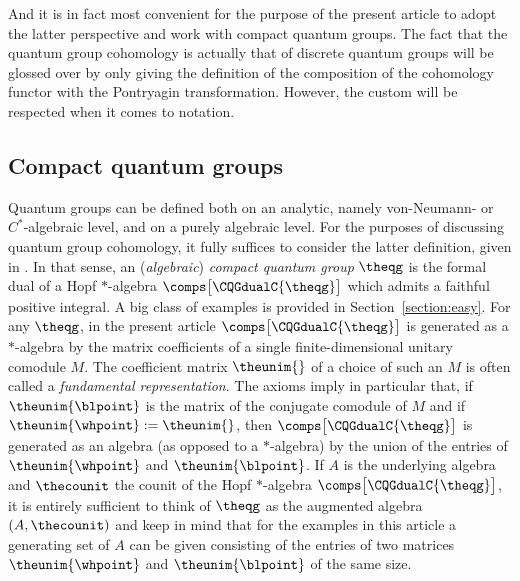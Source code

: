 \documentclass[pdftex]{sigma}
\numberwithin{equation}{section}
\begin{document}
And it is in fact most convenient for the purpose of the present article to adopt the latter perspective and work with compact quantum groups. The fact that the quantum group cohomology is actually that of discrete quantum groups will be glossed over by only giving the definition of the composition of the cohomology functor with the Pontryagin transformation. However, the custom will be respected when it comes to notation.


\subsection{Compact quantum groups}
\label{section:quantum-groups-definition}
{
  \newcommand{\thealgebra}{A}
  \newcommand{\thefund}{\theunim{}}
  \newcommand{\thecomodule}{M}
  \newcommand{\thefundwh}{\theunim{\whpoint}}
  \newcommand{\thefundbl}{\theunim{\blpoint}}
  Quantum groups can be defined both on an analytic, namely von-Neumann- or $C^\ast$-algebraic level, and on a purely algebraic level. For the purposes of discussing quantum group cohomology, it fully suffices to consider the latter definition, given in \cite{DijkhuizenKoornwinder1994}. In that sense, an (\emph{algebraic}) \emph{compact quantum group} $\theqg$ is the formal dual of a Hopf $\ast$-algebra $\comps\bigl[\CQGdualC{\theqg}\bigr]$ which admits a faithful positive integral. A big class of examples is provided in Section~\ref{section:easy}. For any $\theqg$, in the present article $\comps \bigl[\CQGdualC{\theqg} \bigr]$ is generated as a $\ast$-algebra by the matrix coefficients of a single finite-dimensional unitary comodule $\thecomodule$. The coefficient matrix $\thefund$ of a choice of such an $\thecomodule$ is often called a \emph{fundamental representation}.
The axioms imply in particular that, if $\thefundbl$ is the matrix of the conjugate comodule of $\thecomodule$ and if $\thefundwh:= \thefund$, then $\comps \bigl[\CQGdualC{\theqg} \bigr]$ is generated as an algebra (as opposed to a $\ast$-algebra) by the union of the entries of $\thefundwh$ and $\thefundbl$. If $\thealgebra$ is the underlying algebra and $\thecounit$ the counit of the Hopf $\ast$-algebra  $\comps \bigl[\CQGdualC{\theqg} \bigr]$, it is entirely sufficient to think of $\theqg$ as the augmented algebra $(\thealgebra,\thecounit)$ and keep in mind that for the examples in this article a generating set of $\thealgebra$ can be given consisting of the entries of two matrices $\thefundwh$ and $\thefundbl$ of the same size.
}
\end{document}
